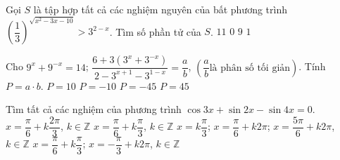 \begin{ex}%
Gọi $S$ là tập hợp tất cả các nghiệm nguyên của bất phương trình $\left(\dfrac{1}{3}\right)^{\sqrt{x^2-3x-10}}>3^{2-x}$. Tìm số phần tử của $S$.
\choice
{$11$}
{$0$}
{\True $9$}
{$1$}
\end{ex}
\begin{ex}%
Cho $9^x+9^{-x}=14$; $\dfrac{6+3(3^x+3^{-x})}{2-3^{x+1}-3^{1-x}}=\dfrac{a}{b}$, $\left(\dfrac{a}{b} \text{là phân số tối giản}\right)$. Tính $P=a\cdot b$.
\choice
{$P=10$}
{$P=-10$}
{\True $P=-45$}
{$P=45$}
\end{ex}
\begin{ex}%
Tìm tất cả các nghiệm của phương trình $\cos3x +\sin2x -\sin4x=0$.
\choice
{$x=\dfrac{\pi}{6}+k\dfrac{2\pi}{3}$, $k\in \mathbb{Z}$}
{\True $x=\dfrac{\pi}{6}+k\dfrac{\pi}{3}$, $k\in \mathbb{Z}$}
{$x=k\dfrac{\pi}{3}$; $x=\dfrac{\pi}{6}+k2\pi$; $x=\dfrac{5\pi}{6}+k2\pi$, $k\in \mathbb{Z}$}
{$x=\dfrac{\pi}{6}+k\dfrac{\pi}{3}$; $x=-\dfrac{\pi}{3}+k2\pi$, $k\in \mathbb{Z}$}
\end{ex}
